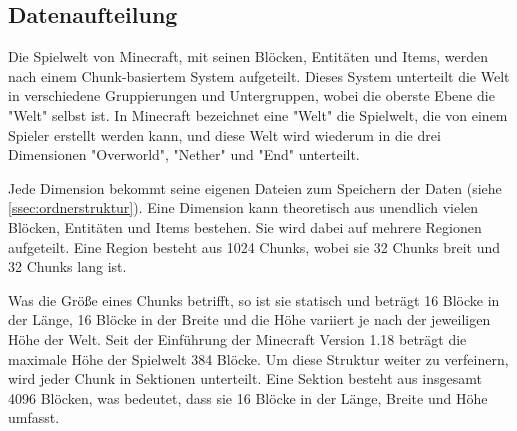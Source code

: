 


\subsection{Datenaufteilung} \label{ssec:datenaufteilung}
Die Spielwelt von Minecraft, mit seinen Blöcken, Entitäten und Items, werden nach einem Chunk-basiertem System aufgeteilt. Dieses System unterteilt die Welt in verschiedene Gruppierungen und Untergruppen, wobei die oberste Ebene die "Welt" selbst ist. In Minecraft bezeichnet eine "Welt" die Spielwelt, die von einem Spieler erstellt werden kann, und diese Welt wird wiederum in die drei Dimensionen "Overworld", "Nether" und "End" unterteilt.\cite{minecraftWorld}

Jede Dimension bekommt seine eigenen Dateien zum Speichern der Daten (siehe \ref{ssec:ordnerstruktur}). Eine Dimension kann theoretisch aus unendlich vielen Blöcken, Entitäten und Items bestehen. Sie wird dabei auf mehrere Regionen aufgeteilt. Eine Region besteht aus 1024 Chunks, wobei sie 32 Chunks breit und 32 Chunks lang ist.\cite{minecraftRegionFile} 

Was die Größe eines Chunks betrifft, so ist sie statisch und beträgt 16 Blöcke in der Länge, 16 Blöcke in der Breite und die Höhe variiert je nach der jeweiligen Höhe der Welt. Seit der Einführung der Minecraft Version 1.18 beträgt die maximale Höhe der Spielwelt 384 Blöcke.\cite{minecraftNewestJavaEdition}\cite{minecraftNewestBedrockEdition} Um diese Struktur weiter zu verfeinern, wird jeder Chunk in Sektionen unterteilt. Eine Sektion besteht aus insgesamt 4096 Blöcken, was bedeutet, dass sie 16 Blöcke in der Länge, Breite und Höhe umfasst.\cite{minecraftChunk}




